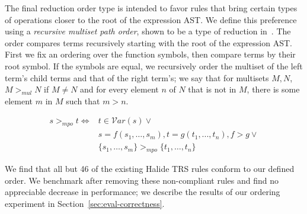 \documentclass[sigplan,10pt,review,anonymous]{acmart}\settopmatter{printfolios=true,printccs=false,printacmref=false}
\newcommand{\NumOrderingProblems}{{\color{red} 46}\xspace}
\begin{document}
The final reduction order type is intended to favor rules that bring certain
types of operations closer to the root of the expression AST.
We define this preference using a \emph{recursive multiset path order}, shown to be a type of reduction in~\cite{baader1999term}. The order compares terms recursively starting with the root of the expression AST. First we
fix an ordering over the function symbols, then compare terms by their root
symbol. If the symbols are equal, we recursively order the multiset of the left
term's child terms and that of the right term's; we say that for multisets $M,
N$, $M >_{mul} N$ if $M \neq N$ and for every element $n$ of $N$ that is not in
$M$, there is some element $m$ in $M$ such that $m > n$.

\begin{equation*}
\begin{split}
s >_{mpo} t \iff & t \in \mathcal{V}ar(s) \vee \\
              &  s = f(s_1,\dots,s_m), t = g(t_1,...,t_n), f > g \vee \\
               & \{s_1, \dots, s_m\} >_{mpo} \{t_1,\dots,t_n\}
\end{split}
\end{equation*}

We find that all but \NumOrderingProblems of the existing Halide TRS rules conform to our defined order. We benchmark after removing these non-compliant rules and find no appreciable decrease in performance; we describe the results of our ordering experiment in Section~\ref{sec:eval-correctness}.
\end{document}
